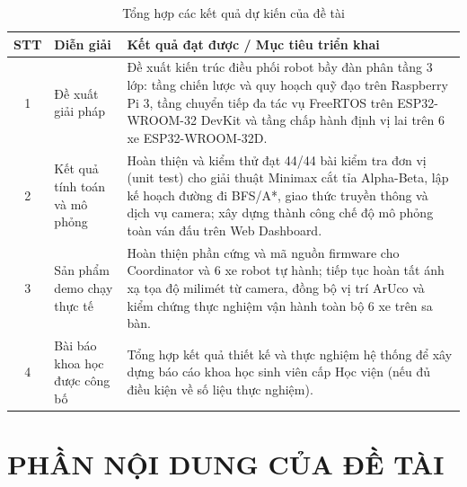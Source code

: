 \documentclass[12pt,a4paper]{report}
\newcommand{\tablefont}{\fontsize{12pt}{15pt}\selectfont}
\begin{document}
	\begin{table}[h!]
		\centering
		\tablefont
		\caption{Tổng hợp các kết quả dự kiến của đề tài}
		\label{tab:ket_qua_du_kien}
		\renewcommand{\arraystretch}{1.25}
		\begin{tabular}{|c|p{3.4cm}|p{9.6cm}|}
			\hline
			\textbf{STT} & \textbf{Diễn giải} & \textbf{Kết quả đạt được / Mục tiêu triển khai} \\
			\hline
			1 & Đề xuất giải pháp & Đề xuất kiến trúc điều phối robot bầy đàn phân tầng 3 lớp: tầng chiến lược và quy hoạch quỹ đạo trên Raspberry Pi 3, tầng chuyển tiếp đa tác vụ FreeRTOS trên ESP32-WROOM-32 DevKit và tầng chấp hành định vị lai trên 6 xe ESP32-WROOM-32D. \\
			\hline
			2 & Kết quả tính toán và mô phỏng & Hoàn thiện và kiểm thử đạt 44/44 bài kiểm tra đơn vị (unit test) cho giải thuật Minimax cắt tỉa Alpha-Beta, lập kế hoạch đường đi BFS/A*, giao thức truyền thông và dịch vụ camera; xây dựng thành công chế độ mô phỏng toàn ván đấu trên Web Dashboard. \\
			\hline
			3 & Sản phẩm demo chạy thực tế & Hoàn thiện phần cứng và mã nguồn firmware cho Coordinator và 6 xe robot tự hành; tiếp tục hoàn tất ánh xạ tọa độ milimét từ camera, đồng bộ vị trí ArUco và kiểm chứng thực nghiệm vận hành toàn bộ 6 xe trên sa bàn. \\
			\hline
			4 & Bài báo khoa học được công bố & Tổng hợp kết quả thiết kế và thực nghiệm hệ thống để xây dựng báo cáo khoa học sinh viên cấp Học viện (nếu đủ điều kiện về số liệu thực nghiệm). \\
			\hline
		\end{tabular}
	\end{table}
	
	\renewcommand{\thesection}{\thechapter.\arabic{section}}
	
	\clearpage
	\chapter*{PHẦN NỘI DUNG CỦA ĐỀ TÀI}
	
\end{document}
